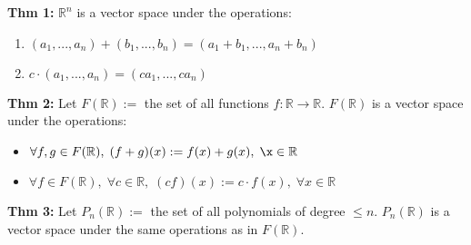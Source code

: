 \textbf{Thm 1:} $\mathbb{R} ^n $ is a vector space under the operations:
\begin{enumerate}
    \item {$(a_1, ..., a_n) + (b_1, ..., b_n) = (a_1 + b_1, ..., a_n + b_n)$} 
    \item {$c \cdot (a_1, ..., a_n) = (ca_1, ..., ca_n)$} 
\end{enumerate}

\textbf{Thm 2:} Let $F(\mathbb{R}) := $ the set of all functions $f:\mathbb{R} \rightarrow \mathbb{R}$. $F(\mathbb{R} )$ is a vector space under the operations:
\begin{itemize}
    \item {$\forall f, g \in F(\mathbb{R}), \; (f + g)(x) := f(x) + g(x), \; \x \in \mathbb{R}$}
    \item {$\forall f \in F(\mathbb{R}), \; \forall c \in \mathbb{R}, \; (cf)(x) := c \cdot f(x), \; \forall x \in \mathbb{R}$}
\end{itemize}

\textbf{Thm 3:} Let $P_n (\mathbb{R}) := $ the set of all polynomials of degree $\le n$. $P_n (\mathbb{R})$ is a vector space under the same operations as in $F(\mathbb{R})$.
